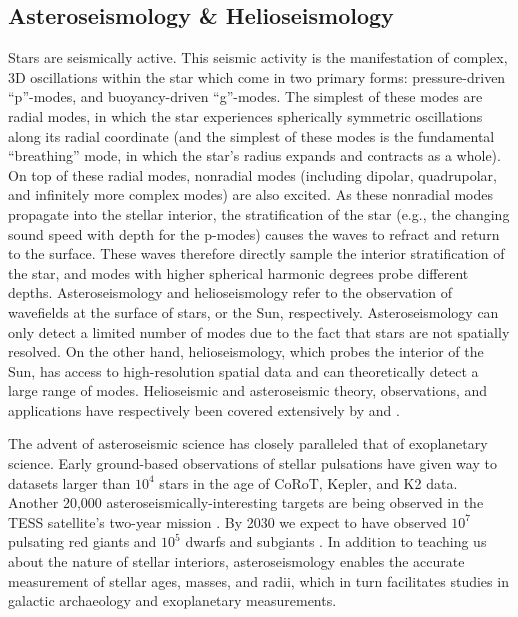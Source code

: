 \subsection{Asteroseismology \& Helioseismology}
\label{sct:asteroseismology}
Stars are seismically active.
This seismic activity is the manifestation of complex, 3D oscillations within the star which come in two primary forms: pressure-driven ``p''-modes, and buoyancy-driven ``g''-modes.
The simplest of these modes are radial modes, in which the star experiences spherically symmetric oscillations along its radial coordinate (and the simplest of these modes is the fundamental ``breathing'' mode, in which the star's radius expands and contracts as a whole).
On top of these radial modes, nonradial modes (including dipolar, quadrupolar, and infinitely more complex modes) are also excited.
As these nonradial modes propagate into the stellar interior, the stratification of the star (e.g., the changing sound speed with depth for the p-modes) causes the waves to refract and return to the surface.
These waves therefore directly sample the interior stratification of the star, and modes with higher spherical harmonic degrees probe different depths.
Asteroseismology and helioseismology refer to the observation of wavefields at the surface of stars, or the Sun, respectively.
Asteroseismology can only detect a limited number of modes due to the fact that stars are not spatially resolved.
On the other hand, helioseismology, which probes the interior of the Sun, has access to high-resolution spatial data and can theoretically detect a large range of modes.
Helioseismic and asteroseismic theory, observations, and applications have respectively been covered extensively by \cite{christensen-dalsgaard2002} and \cite{aerts&all2010}.

The advent of asteroseismic science has closely paralleled that of exoplanetary science.
Early ground-based observations of stellar pulsations \cite[e.g.,][]{kjeldsen&frandsen1991, bouchy&carrier2001, bedding&all2001} have given way to datasets larger than $10^4$ stars \cite[e.g.,][]{yu&all2018, santos&all2019b} in the age of CoRoT, Kepler, and K2 data.
Another 20,000 asteroseismically-interesting targets are being observed in the TESS satellite's two-year mission \citep{schofield&all2019}.
By 2030 we expect to have observed $10^7$ pulsating red giants and $10^5$ dwarfs and subgiants \citep{huber&all2019}.
In addition to teaching us about the nature of stellar interiors, asteroseismology enables the accurate measurement of stellar ages, masses, and radii, which in turn facilitates studies in galactic archaeology and exoplanetary measurements.

